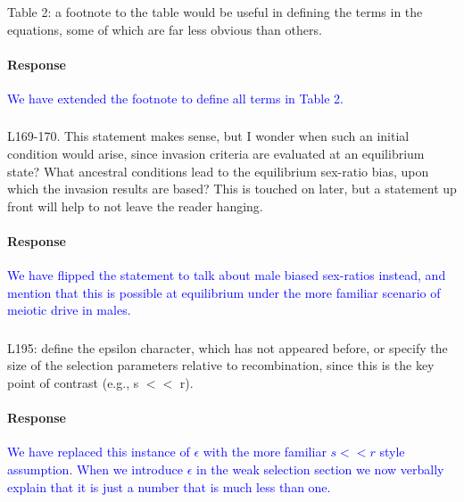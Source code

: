 \documentclass[10pt,letterpaper]{article}
\begin{document}
\noindent\subsubsection{}
Table 2: a footnote to the table would be useful in defining the terms in the equations, some of which are far less obvious than others.

\noindent\paragraph{Response}
\textcolor{blue}{We have extended the footnote to define all terms in Table 2.}

\noindent\subsubsection{}
L169-170. This statement makes sense, but I wonder when such an initial condition would arise, since invasion criteria are evaluated at an equilibrium state? What ancestral conditions lead to the equilibrium sex-ratio bias, upon which the invasion results are based? This is touched on later, but a statement up front will help to not leave the reader hanging.

\noindent\paragraph{Response}
\textcolor{blue}{We have flipped the statement to talk about male biased sex-ratios instead, and mention that this is possible at equilibrium under the more familiar scenario of meiotic drive in males.}

\noindent\subsubsection{}
L195: define the epsilon character, which has not appeared before, or specify the size of the selection parameters relative to recombination, since this is the key point of contrast (e.g., s $<<$ r).

\noindent\paragraph{Response}
\textcolor{blue}{We have replaced this instance of $\epsilon$ with the more familiar $s<<r$ style assumption. When we introduce $\epsilon$ in the weak selection section we now verbally explain that it is just a number that is much less than one.}
\end{document}
